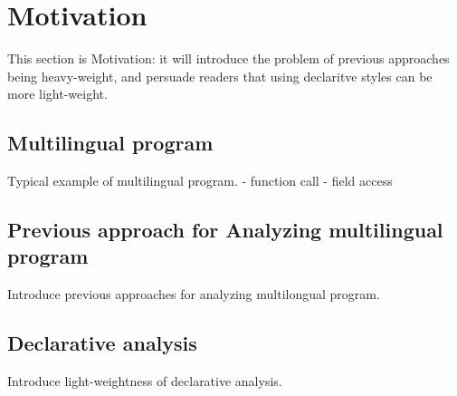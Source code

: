 \section{Motivation}
This section is Motivation:
it will introduce the problem of previous approaches being heavy-weight,
and persuade readers that using declaritve styles can be more light-weight.

\subsection{Multilingual program}
Typical example of multilingual program.
- function call
- field access

\subsection{Previous approach for Analyzing multilingual program}
Introduce previous approaches for analyzing multilongual program.

\subsection{Declarative analysis}
Introduce light-weightness of declarative analysis. 
